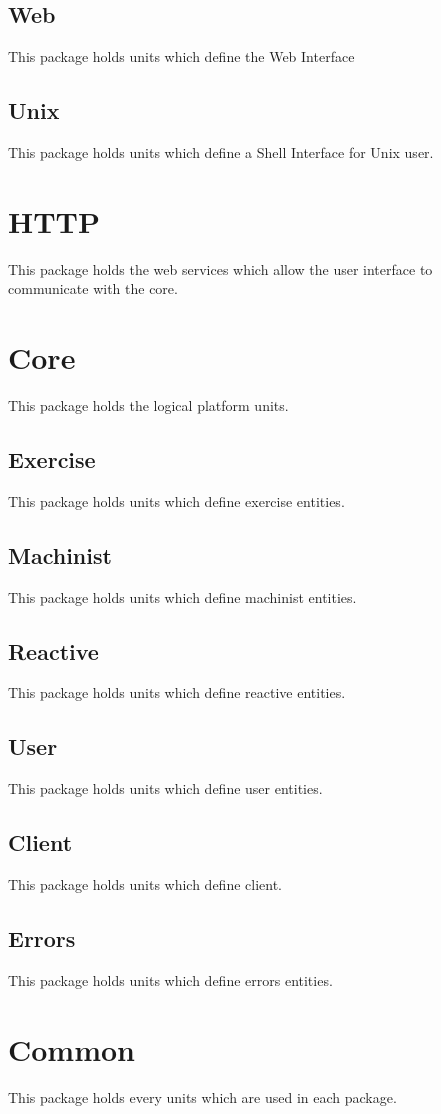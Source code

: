 		\subsection{Web}
			This package holds units which define the Web Interface
		\subsection{Unix}
			This package holds units which define a Shell Interface for Unix user.
	\section{HTTP}
		This package holds the web services which allow the user interface to communicate with the core.
	\section{Core}
		This package holds the logical platform units.
		\subsection{Exercise}
			This package holds units which define exercise entities.
		\subsection{Machinist}
			This package holds units which define machinist entities.
		\subsection{Reactive}
			This package holds units which define reactive entities.
		\subsection{User}
			This package holds units which define user entities.
		\subsection{Client}
			This package holds units which define client.
		\subsection{Errors}
			This package holds units which define errors entities.
	\section{Common}
		This package holds every units which are used in each package.
